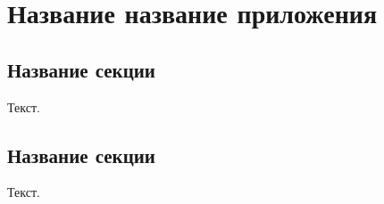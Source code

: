 
\chapter{Название название приложения}
\label{app2}

\section{Название секции}
\label{app1:sec1}

Текст.

\section{Название секции}
\label{app2:sec2}

Текст.


